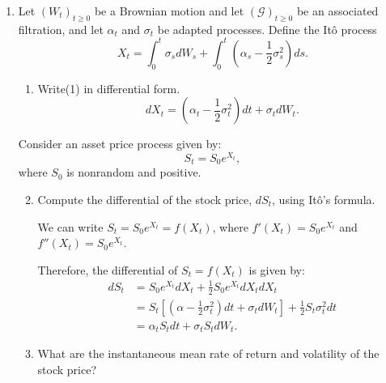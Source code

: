 \documentclass[handout,8pt]{beamer}
\begin{document}
\begin{frame}[allowframebreaks]{ }
\begin{enumerate}
    \vspace*{1.5cm}
    
    \item Let $(W_t)_{t\geq 0}$ be a Brownian motion and let $(\mathcal{G})_{t\geq 0}$ be an associated filtration, and let $\alpha_t$ and $\sigma_t$ be adapted processes. Define the Itô process
    \begin{equation}
        X_t = \int_0^t \sigma_s dW_s + \int_0^t \left(\alpha_s -\frac{1}{2}\sigma_s^2 \right) ds.
    \end{equation}
    
    \begin{enumerate}
        \item Write(1) in differential form.
        \begin{equation*}
            dX_t = \left(\alpha_t -\frac{1}{2}\sigma_t^2\right) dt + \sigma_t dW_t.
        \end{equation*}
    \end{enumerate}
    
    Consider an asset price process given by:
    \begin{equation}
        S_t=S_0e^{X_t},
    \end{equation}
    where $S_0$ is nonrandom and positive.
    
    \newpage
    
    \begin{enumerate}
        \setcounter{enumii}{1}
    
        \item Compute the differential of the stock price, $dS_t$, using Itô's formula. \newline
        
        We can write $S_t=S_0 e^{X_t} = f(X_t)$, where $f'(X_t)=S_0e^{X_t}$ and $f''(X_t)=S_0e^{X_t}$. \newline
        
        Therefore, the differential of $S_t=f(X_t)$ is given by:
        \begin{align*}
            dS_t &= S_0e^{X_t} dX_t + \frac{1}{2}S_0e^{X_t} dX_t dX_t\\
            &= S_t\left[\left(\alpha -\frac{1}{2}\sigma_t^2 \right) dt + \sigma_t dW_t\right] + \frac{1}{2}S_t\sigma_t^2 dt\\
            &= \alpha_t S_t dt + \sigma_t S_t dW_t. 
        \end{align*}

        \item What are the instantaneous mean rate of return and volatility of the stock price? \newline
        

\end{enumerate}
\end{enumerate}
\end{frame}
\end{document}
